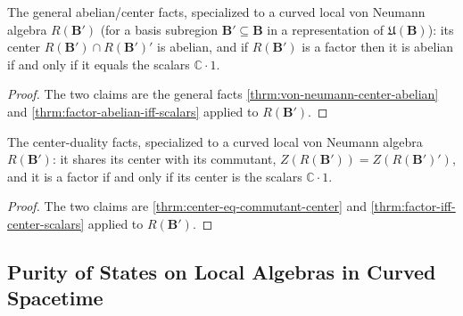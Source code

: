 \begin{theorem}
    \label{thrm:abelian-local-von-neumann-in-curved-spacetime}
    \leanok
    The general abelian/center facts, specialized to a curved local von Neumann algebra $R(\mathbf{B}')$ (for a basis subregion $\mathbf{B}' \subseteq \mathbf{B}$ in a representation of $\mathfrak{U}(\mathbf{B})$): its center $R(\mathbf{B}') \cap R(\mathbf{B}')'$ is abelian, and if $R(\mathbf{B}')$ is a factor then it is abelian if and only if it equals the scalars $\mathbb{C}\cdot 1$.
\end{theorem}
\begin{proof}
    \leanok
    The two claims are the general facts \ref{thrm:von-neumann-center-abelian} and \ref{thrm:factor-abelian-iff-scalars} applied to $R(\mathbf{B}')$.
\end{proof}

\begin{theorem}
    \label{thrm:center-duality-local-von-neumann-in-curved-spacetime}
    \leanok
    The center-duality facts, specialized to a curved local von Neumann algebra $R(\mathbf{B}')$: it shares its center with its commutant, $Z(R(\mathbf{B}')) = Z(R(\mathbf{B}')')$, and it is a factor if and only if its center is the scalars $\mathbb{C}\cdot 1$.
\end{theorem}
\begin{proof}
    \leanok
    The two claims are \ref{thrm:center-eq-commutant-center} and \ref{thrm:factor-iff-center-scalars} applied to $R(\mathbf{B}')$.
\end{proof}

\subsection{Purity of States on Local Algebras in Curved Spacetime}

